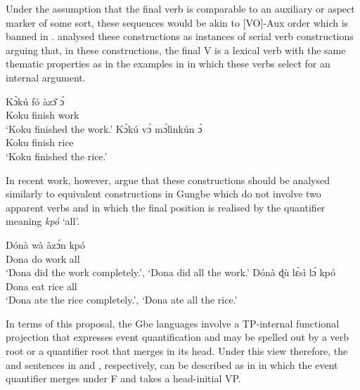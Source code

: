 \documentclass[output=paper]{langsci/langscibook}
\begin{document}
Under the assumption that the final verb is comparable to an auxiliary or
aspect marker of some sort, these sequences would be akin to [VO]-Aux order
which is banned in  \parencite[cf.][173]{BibHolRob2014}.
 analysed these constructions as instances of serial verb
constructions arguing that, in these constructions, the final V is a
lexical verb with the same thematic properties as in the examples in
 in which these verbs select for an internal argument.

\ea\label{ex:aboh:14.8}  \parencite[363]{DaCruz1995}
    \ea\label{ex:aboh:14.8a}
        \gll    K\`ɔkú fó àz\v{ɔ} \'ɔ \\
                Koku finish work \Det{} \\
        \glt    \enquote*{Koku finished the work.}
    \ex\label{ex:aboh:14.8b}
        \gll    K\`ɔkú v\`ɔ m\'ɔlìnkún \'ɔ \\
                Koku finish rice \Det{} \\
        \glt    \enquote*{Koku finished the rice.}
    \z
\z

In recent work, however, \citet{VandenBergAboh2013} argue that these
constructions should be analysed similarly to equivalent constructions in
Gungbe which do not involve two apparent verbs and in which the final position
is realised by the quantifier meaning \textit{kpó} ‘all’.

\ea\label{ex:aboh:14.9} 
    \ea\label{ex:aboh:14.9a}
        \gll    Dónà wà àz\'ɔn kpó \\
                Dona do work all \\
        \glt    \enquote*{Dona did the work completely.}, \enquote*{Dona did
                all the work.}
    \ex\label{ex:aboh:14.9b}
        \gll    Dónà ɖù l\'ɛsì l\'ɔ kpó \\
                Dona eat rice \Det{} all \\
        \glt    \enquote*{Dona ate the rice completely.}, \enquote*{Dona ate
                all the rice.}
    \z
\z

In terms of this proposal, the Gbe languages involve a TP-internal functional
projection that expresses event quantification and may be spelled out by a verb
root or a quantifier root that merges in its head. Under this view therefore,
the  and  sentences in  and ,
respectively, can be described as in  in which the event
quantifier merges under F and takes a head-initial VP.
\end{document}
